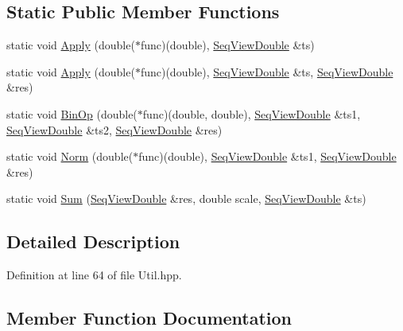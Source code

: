 \subsection*{Static Public Member Functions}
\begin{DoxyCompactItemize}
\item 
static void \hyperlink{classtsa_1_1_util_a16b9b14ed5803ca10e8497543d9a2d54}{Apply} (double($\ast$func)(double), \hyperlink{namespacetsa_ac599574bcc094eda25613724b8f3ca9e}{Seq\+View\+Double} \&ts)
\item 
static void \hyperlink{classtsa_1_1_util_af4136a5000f4168d4ba4db40c3aa2080}{Apply} (double($\ast$func)(double), \hyperlink{namespacetsa_ac599574bcc094eda25613724b8f3ca9e}{Seq\+View\+Double} \&ts, \hyperlink{namespacetsa_ac599574bcc094eda25613724b8f3ca9e}{Seq\+View\+Double} \&res)
\item 
static void \hyperlink{classtsa_1_1_util_afbd158ce20afc089209fb7322ef13777}{Bin\+Op} (double($\ast$func)(double, double), \hyperlink{namespacetsa_ac599574bcc094eda25613724b8f3ca9e}{Seq\+View\+Double} \&ts1, \hyperlink{namespacetsa_ac599574bcc094eda25613724b8f3ca9e}{Seq\+View\+Double} \&ts2, \hyperlink{namespacetsa_ac599574bcc094eda25613724b8f3ca9e}{Seq\+View\+Double} \&res)
\item 
static void \hyperlink{classtsa_1_1_util_ad39a3bcca5699dfa0a9672f764f97805}{Norm} (double($\ast$func)(double), \hyperlink{namespacetsa_ac599574bcc094eda25613724b8f3ca9e}{Seq\+View\+Double} \&ts1, \hyperlink{namespacetsa_ac599574bcc094eda25613724b8f3ca9e}{Seq\+View\+Double} \&res)
\item 
static void \hyperlink{classtsa_1_1_util_adf9b21b326aec4a49d09083d35eaca91}{Sum} (\hyperlink{namespacetsa_ac599574bcc094eda25613724b8f3ca9e}{Seq\+View\+Double} \&res, double scale, \hyperlink{namespacetsa_ac599574bcc094eda25613724b8f3ca9e}{Seq\+View\+Double} \&ts)
\end{DoxyCompactItemize}


\subsection{Detailed Description}


Definition at line 64 of file Util.\+hpp.



\subsection{Member Function Documentation}
\mbox{\label{classtsa_1_1_util_a16b9b14ed5803ca10e8497543d9a2d54}} 
